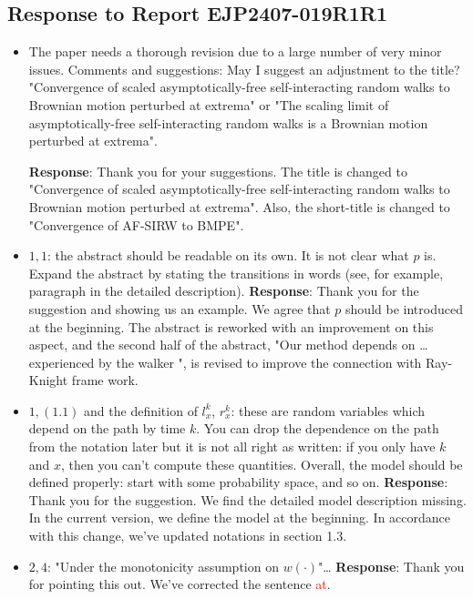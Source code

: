 \documentclass[11pt,a4paper]{article}
\numberwithin{equation}{section}
\def\TBF#1{\textcolor{red}{#1}} %
\begin{document}
	\subsection*{Response to Report EJP2407-019R1R1}
	\begin{itemize}
		\item The paper needs a thorough revision due to a large number of very minor issues.
		Comments and suggestions: May I suggest an adjustment to the title? "Convergence of scaled
		asymptotically-free self-interacting random walks to Brownian motion perturbed at extrema" or "The scaling limit of asymptotically-free self-interacting random walks is a Brownian motion perturbed at
		extrema".
		
		\subitem \textbf{Response}:  Thank you for your suggestions. The title is changed to "Convergence of scaled asymptotically-free
		self-interacting random walks to Brownian motion
		perturbed at extrema". Also, the short-title is changed to "Convergence of AF-SIRW to BMPE". 
		
		\item 
		$1,1$: the abstract should be readable on its own. It is not clear what $p$ is. Expand the abstract by stating the transitions in words (see, for example, paragraph in the detailed description).
		\subitem \textbf{Response}: Thank you for the suggestion and showing us an example. We agree that $p$ should be introduced at the beginning. The abstract is reworked with an improvement on this aspect, and the second half of the abstract, "Our method depends on \dots experienced by the walker ", is revised to improve the connection with Ray-Knight frame work. 
		
		\item 
		$1,(1.1)$ and the definition of $l_x^k$, $r_x^k$: these are random variables which depend on the path by time $k$. You can drop the dependence on the path from the notation later but it is not all right as written:	if you only have $k$ and $x$, then you can't compute these quantities. Overall, the model should be defined properly: start with some probability space, and so on.
		\subitem \textbf{Response}: Thank you for the suggestion. We find the detailed model description missing. In the current version, we define the model at the beginning. In accordance with this change, we've updated notations in section 1.3.
		
		\item 
		$2,4$: "Under the monotonicity assumption on $w(\cdot)$"\dots
		\subitem \textbf{Response}: Thank you for pointing this out.  We've corrected the sentence \TBF{at}. 
		

\end{itemize}
\end{document}
